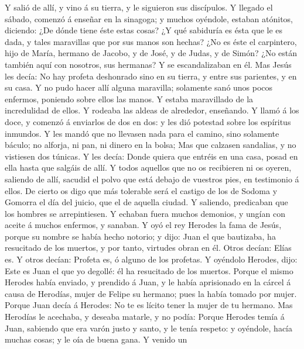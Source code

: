  Y salió de allí, y vino á su tierra, y le siguieron sus
discípulos.  Y llegado el sábado, comenzó á enseñar en la
sinagoga; y muchos oyéndole, estaban atónitos, diciendo: ¿De dónde tiene
éste estas cosas? ¿Y qué sabiduría es ésta que le es dada, y tales
maravillas que por sus manos son hechas?  ¿No es éste el
carpintero, hijo de María, hermano de Jacobo, y de José, y de Judas, y
de Simón? ¿No están también aquí con nosotros, sus hermanas? Y se
escandalizaban en él.  Mas Jesús les decía: No hay profeta
deshonrado sino en su tierra, y entre sus parientes, y en su casa.
 Y no pudo hacer allí alguna maravilla; solamente sanó unos
pocos enfermos, poniendo sobre ellos las manos.  Y estaba
maravillado de la incredulidad de ellos. Y rodeaba las aldeas de
alrededor, enseñando.  Y llamó á los doce, y comenzó á
enviarlos de dos en dos: y les dió potestad sobre los espíritus
inmundos.  Y les mandó que no llevasen nada para el camino,
sino solamente báculo; no alforja, ni pan, ni dinero en la bolsa;
 Mas que calzasen sandalias, y no vistiesen dos túnicas.
 Y les decía: Donde quiera que entréis en una casa, posad
en ella hasta que salgáis de allí.  Y todos aquellos que no
os recibieren ni os oyeren, saliendo de allí, sacudid el polvo que está
debajo de vuestros pies, en testimonio á ellos. De cierto os digo que
más tolerable será el castigo de los de Sodoma y Gomorra el día del
juicio, que el de aquella ciudad.  Y saliendo, predicaban
que los hombres se arrepintiesen.  Y echaban fuera muchos
demonios, y ungían con aceite á muchos enfermos, y sanaban.
 Y oyó el rey Herodes la fama de Jesús, porque su nombre se
había hecho notorio; y dijo: Juan el que bautizaba, ha resucitado de los
muertos, y por tanto, virtudes obran en él.  Otros decían:
Elías es. Y otros decían: Profeta es, ó alguno de los profetas.
 Y oyéndolo Herodes, dijo: Este es Juan el que yo degollé:
él ha resucitado de los muertos.  Porque el mismo Herodes
había enviado, y prendido á Juan, y le había aprisionado en la cárcel á
causa de Herodías, mujer de Felipe su hermano; pues la había tomado por
mujer.  Porque Juan decía á Herodes: No te es lícito tener
la mujer de tu hermano.  Mas Herodías le acechaba, y
deseaba matarle, y no podía:  Porque Herodes temía á Juan,
sabiendo que era varón justo y santo, y le tenía respeto: y oyéndole,
hacía muchas cosas; y le oía de buena gana.  Y venido un
